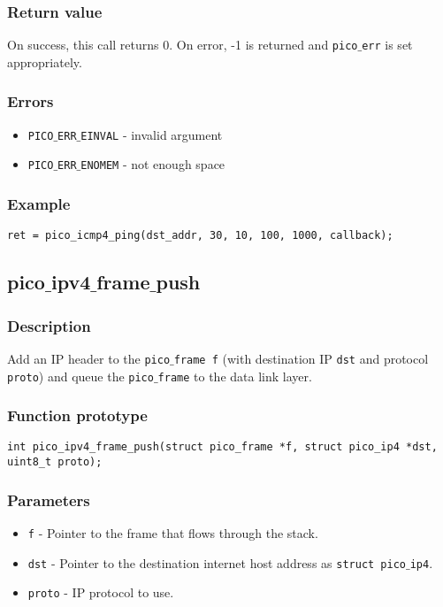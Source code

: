\subsubsection*{Return value}
On success, this call returns 0.
On error, -1 is returned and \texttt{pico$\_$err} is set appropriately.

\subsubsection*{Errors}
\begin{itemize}[noitemsep]
\item \texttt{PICO$\_$ERR$\_$EINVAL} - invalid argument
\item \texttt{PICO$\_$ERR$\_$ENOMEM} - not enough space
\end{itemize}

\subsubsection*{Example}
\begin{verbatim}
ret = pico_icmp4_ping(dst_addr, 30, 10, 100, 1000, callback);
\end{verbatim}


\subsection{pico$\_$ipv4$\_$frame$\_$push}

\subsubsection*{Description}
Add an IP header to the \texttt{pico$\_$frame f} (with destination IP \texttt{dst} and protocol
\texttt{proto}) and queue the \texttt{pico$\_$frame} to the data link layer.

\subsubsection*{Function prototype}
\begin{verbatim}
int pico_ipv4_frame_push(struct pico_frame *f, struct pico_ip4 *dst, uint8_t proto);
\end{verbatim}

\subsubsection*{Parameters}
\begin{itemize}[noitemsep]
\item \texttt{f} - Pointer to the frame that flows through the stack.
\item \texttt{dst} - Pointer to the destination internet host address as \texttt{struct pico$\_$ip4}.
\item \texttt{proto} - IP protocol to use. 
\end{itemize}

